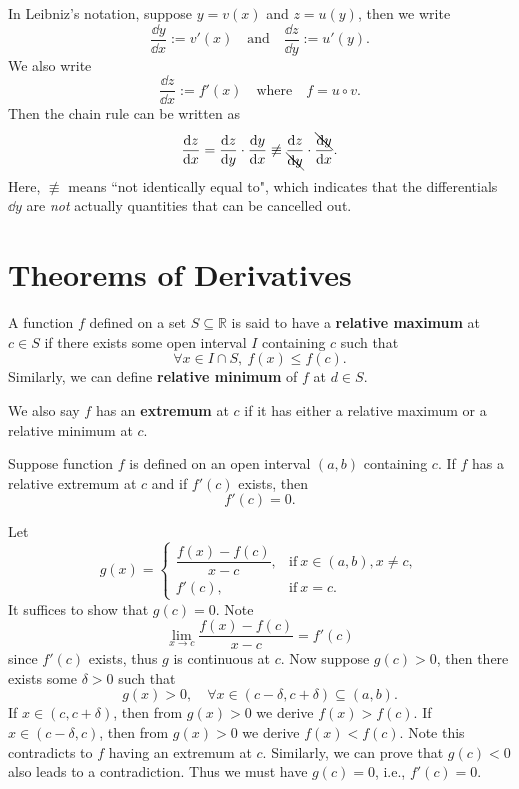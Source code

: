 	\begin{remarkenv}
		In Leibniz's notation, suppose $y=v(x)$ and $z=u(y)$, then we write
		\[
		\frac{\dd y}{\dd x}:=v'(x)
		\quad \text{and}\quad
		\frac{\dd z}{\dd y}:=u'(y).
		\]
		We also write
		\[
		\frac{\dd z}{\dd x} := f'(x)
		\quad \text{where}\quad f=u \circ v.
		\]
		Then the chain rule can be written as
		\[
		\frac{\dd z}{\dd x} = \frac{\dd z}{\dd y} \cdot \frac{\dd y}{\dd x} \not\equiv \frac{\dd z}{\bcancel{\dd y}}\cdot \frac{\bcancel{\dd y}}{\dd x}.
		\]
		Here, $\not \equiv$ means ``not identically equal to", which indicates that the differentials $\dd y$ are \emph{not} actually quantities that can be cancelled out.
	\end{remarkenv}

	\section{Theorems of Derivatives}
	\begin{definitionenv}
		A function $f$ defined on a set $S \subseteq \mathbb{R}$ is said to have a \textbf{relative maximum} at $c\in S$ if there exists some open interval $I$ containing $c$ such that
		\[
		\forall x \in I \cap S,\ f(x) \le f(c).
		\]
		Similarly, we can define \textbf{relative minimum} of $f$ at $d\in S$.
	\end{definitionenv}
	\begin{remarkenv}
		We also say $f$ has an \textbf{extremum} at $c$ if it has either a relative maximum or a relative minimum at $c$.
	\end{remarkenv}
	\begin{theoremenv}
		Suppose function $f$ is defined on an open interval $(a,b)$ containing $c$. If $f$ has a relative extremum at $c$ and if $f'(c)$ exists, then
		\[
		f'(c)=0.
		\]
	\end{theoremenv}
	\begin{proofenv}
		Let
		\[
		g(x)=\begin{cases}
		\dfrac{f(x)-f(c)}{x-c}, & \text{if}\ x \in (a,b), x\neq c,\\[6pt]
		f'(c), & \text{if}\ x=c.
		\end{cases}
		\]
		It suffices to show that $g(c)=0$. Note
		\[
		\lim_{x \to c} \frac{f(x)-f(c)}{x-c}=f'(c)
		\]
		since $f'(c)$ exists, thus $g$ is continuous at $c$. Now suppose $g(c)>0$, then there exists some $\delta>0$ such that
		\[
		g(x)>0,\quad \forall x\in (c-\delta, c+\delta) \subseteq (a,b).
		\]
		If $x\in(c, c+\delta)$, then from $g(x)>0$ we derive $f(x)>f(c)$. If $x\in(c-\delta, c)$, then from $g(x)>0$ we derive $f(x)<f(c)$. Note this contradicts to $f$ having an extremum at $c$. Similarly, we can prove that $g(c)<0$ also leads to a contradiction. Thus we must have $g(c)=0$, i.e., $f'(c)=0$.
	\end{proofenv}
